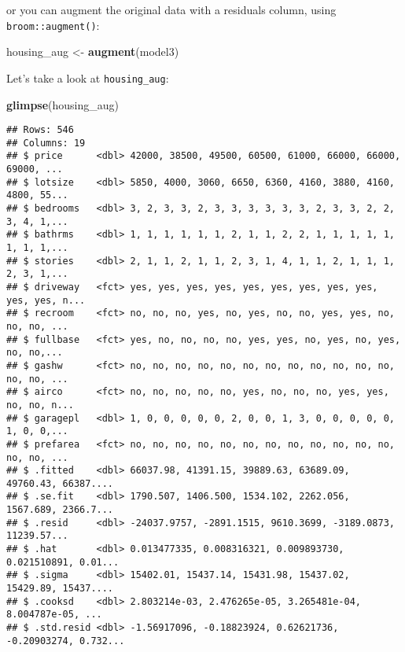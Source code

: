 \documentclass[
]{article}
\newenvironment{Shaded}{\begin{snugshade}}{\end{snugshade}}
\newcommand{\KeywordTok}[1]{\textcolor[rgb]{0.13,0.29,0.53}{\textbf{#1}}}
\newcommand{\NormalTok}[1]{#1}
\newcommand{\StringTok}[1]{\textcolor[rgb]{0.31,0.60,0.02}{#1}}
\begin{document}
or you can augment the original data with a residuals column, using \texttt{broom::augment()}:

\begin{Shaded}
\begin{Highlighting}[]
\NormalTok{housing\_aug \textless{}{-}}\StringTok{ }\KeywordTok{augment}\NormalTok{(model3)}
\end{Highlighting}
\end{Shaded}

Let's take a look at \texttt{housing\_aug}:

\begin{Shaded}
\begin{Highlighting}[]
\KeywordTok{glimpse}\NormalTok{(housing\_aug)}
\end{Highlighting}
\end{Shaded}

\begin{verbatim}
## Rows: 546
## Columns: 19
## $ price      <dbl> 42000, 38500, 49500, 60500, 61000, 66000, 66000, 69000, ...
## $ lotsize    <dbl> 5850, 4000, 3060, 6650, 6360, 4160, 3880, 4160, 4800, 55...
## $ bedrooms   <dbl> 3, 2, 3, 3, 2, 3, 3, 3, 3, 3, 3, 2, 3, 3, 2, 2, 3, 4, 1,...
## $ bathrms    <dbl> 1, 1, 1, 1, 1, 1, 2, 1, 1, 2, 2, 1, 1, 1, 1, 1, 1, 1, 1,...
## $ stories    <dbl> 2, 1, 1, 2, 1, 1, 2, 3, 1, 4, 1, 1, 2, 1, 1, 1, 2, 3, 1,...
## $ driveway   <fct> yes, yes, yes, yes, yes, yes, yes, yes, yes, yes, yes, n...
## $ recroom    <fct> no, no, no, yes, no, yes, no, no, yes, yes, no, no, no, ...
## $ fullbase   <fct> yes, no, no, no, no, yes, yes, no, yes, no, yes, no, no,...
## $ gashw      <fct> no, no, no, no, no, no, no, no, no, no, no, no, no, no, ...
## $ airco      <fct> no, no, no, no, no, yes, no, no, no, yes, yes, no, no, n...
## $ garagepl   <dbl> 1, 0, 0, 0, 0, 0, 2, 0, 0, 1, 3, 0, 0, 0, 0, 0, 1, 0, 0,...
## $ prefarea   <fct> no, no, no, no, no, no, no, no, no, no, no, no, no, no, ...
## $ .fitted    <dbl> 66037.98, 41391.15, 39889.63, 63689.09, 49760.43, 66387....
## $ .se.fit    <dbl> 1790.507, 1406.500, 1534.102, 2262.056, 1567.689, 2366.7...
## $ .resid     <dbl> -24037.9757, -2891.1515, 9610.3699, -3189.0873, 11239.57...
## $ .hat       <dbl> 0.013477335, 0.008316321, 0.009893730, 0.021510891, 0.01...
## $ .sigma     <dbl> 15402.01, 15437.14, 15431.98, 15437.02, 15429.89, 15437....
## $ .cooksd    <dbl> 2.803214e-03, 2.476265e-05, 3.265481e-04, 8.004787e-05, ...
## $ .std.resid <dbl> -1.56917096, -0.18823924, 0.62621736, -0.20903274, 0.732...
\end{verbatim}
\end{document}
